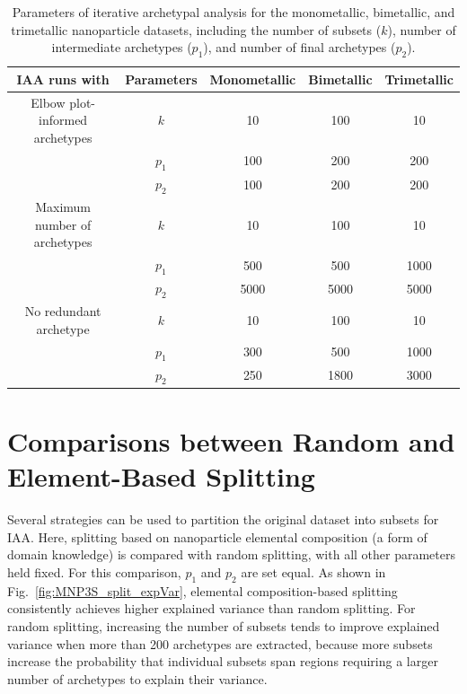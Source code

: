 \documentclass[12pt]{article}
\newcommand{\revision}[1]{{\color{red}#1}}
\begin{document}
\begin{table}[htbp!]
\caption{Parameters of iterative archetypal analysis for the monometallic, bimetallic, and trimetallic nanoparticle datasets, including the number of subsets ($k$), number of intermediate archetypes ($p_1$), and number of final archetypes ($p_2$).}
\centering
\small
\begin{tabular}{cc|ccc}
\hline
IAA runs with                  & Parameters &  Monometallic &  Bimetallic &  Trimetallic \\
\hline
Elbow plot-informed archetypes & $k$        &   10 &  100 &   10 \\
                               & $p_1$      &  100 &  200 &  200 \\
                               & $p_2$      &  100 &  200 &  200 \\
Maximum number of archetypes   & $k$        &   10 &  100 &   10 \\
                               & $p_1$      &  \revision{500} &  500 & 1000 \\
                               & $p_2$      & 5000 & 5000 & 5000 \\
No redundant archetype         & $k$        &   10 &  100 &   10 \\
                               & $p_1$      &  300 &  500 & 1000 \\
                               & $p_2$      &  250 & 1800 & 3000 \\
\hline
\end{tabular}
\label{tab:redRedAppendixIAAparams}
\end{table}



\section{Comparisons between Random and Element-Based Splitting}
\label{sec:SIRandomVsElementSplitting}

Several strategies can be used to partition the original dataset into subsets for IAA. Here, splitting based on nanoparticle elemental composition (a form of domain knowledge) is compared with random splitting, with all other parameters held fixed. For this comparison, $p_1$ and $p_2$ are set equal. As shown in Fig.~\ref{fig:MNP3S_split_expVar}, elemental composition-based splitting consistently achieves higher explained variance than random splitting. For random splitting, increasing the number of subsets tends to improve explained variance when more than 200 archetypes are extracted, because more subsets increase the probability that individual subsets span regions requiring a larger number of archetypes to explain their variance.
\end{document}
